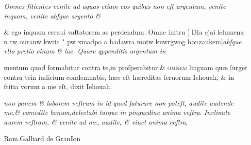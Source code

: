 \documentclass{article}
\begin{document}
{\begin{multicols}{2}
	\columnbreak
	\justifying
	\noindent
	\textit{Omnes ſitientes venite ad aquas etiam vos quibus non eſt argentum, venite inquam, venite abſque argento {\&}\\}
\end{multicols}
\fontsize{6.25}{7}\selectfont
\vspace{-2.7\baselineskip}
\noindent \& ego inquam creaui vaſtatorem as perdendum. Omne inſtru \hfill[\hfill %
	{\grecs DIa ejai lelumena n tw ouranw kwria " pw xmadpo a badawra motw kuwrgwog bonzaukem}\hfill]\hfill \textit{abſque vllo pretio vinum \& lac. Quare qppenditis argentum in}
\vspace{-1.6\baselineskip}
\begin{multicols}{2}
	\fontsize{6.25}{7}\selectfont
	\justifying
	\noindent mentum quod formabitur contra te,in proſperabitur,\& \textsc{ omnem} linguam qu\ae{} ſurget contra tein iudicium\linebreak
	condemnabis, h\ae{}c eſt h\ae{}reditas ſeruorum Iehouah, \& in ſtitia vorum a me eſt, dixit Iehouah.

	\columnbreak
	\justifying
	\noindent
	\textit{non panem \& laborem veſtrum in id quod ſaturare non poteſt, audite audende me,\& comedite bonum,delectabi\linebreak
		turque in pinguedine anima veſtra. Inclinate aurem veſtram, \& venite ad me, audite, \& viuet anima veſtra,\linebreak
	}
\end{multicols}
\vspace{-3.5\baselineskip}
\setlength{\columnsep}{3mm}
\begin{multicols}{4}
	\tiny
	\centering
	Rom.Galliard de GranIon\\
	\vspace{\baselineskip}
	\fontsize{4}{4.5}\selectfont
	\justifying
	\noindent {}


\end{multicols}}
\end{document}
